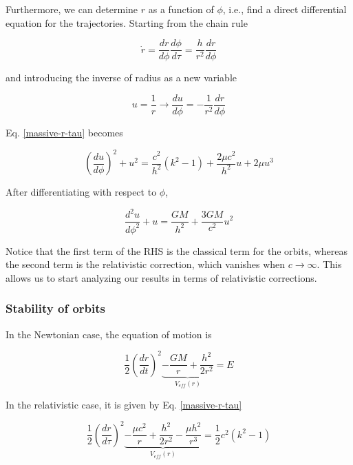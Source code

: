 \documentclass[letterpaper,11pt,onecolumn]{article}
\begin{document}
Furthermore, we can determine $r$ as a function of $\phi$, i.e., find a direct differential equation for the trajectories. Starting from the chain rule 

\begin{equation*}
    \dot{r} = \frac{dr}{d\phi} \frac{d\phi}{d\tau} = \frac{h}{r^2} \frac{dr}{d\phi} 
\end{equation*}

and introducing the inverse of radius as a new variable 

\begin{equation*}
    u = \frac{1}{r} \longrightarrow \frac{du}{d\phi} = - \frac{1}{r^2} \frac{dr}{d\phi}
\end{equation*}

Eq. \ref{massive-r-tau} becomes

\begin{equation}
    \left( \frac{du}{d\phi} \right)^2 + u^2 = \frac{c^2}{h^2} (k^2 - 1) + \frac{2\mu c^2}{h^2} u + 2 \mu u^3
\end{equation}

After differentiating with respect to $\phi$, 

\begin{equation} \label{massive-u-eq}
    \frac{d^2u}{d \phi^2} + u = \frac{GM}{h^2} + \frac{3GM}{c^2} u^2
\end{equation}

Notice that the first term of the RHS is the classical term for the orbits, whereas the second term is the relativistic correction, which vanishes when $c\to\infty$. This allows us to start analyzing our results in terms of relativistic corrections. 

\subsubsection{Stability of orbits}

In the Newtonian case, the equation of motion is 

\begin{equation} \label{massive-traj-newton}
    \frac12 \left( \frac{dr}{dt} \right)^2  \underbrace{-\frac{GM}{r} + \frac{h^2}{2r^2}}_{V_{eff}(r)} = E
\end{equation}

In the relativistic case, it is given by Eq. \ref{massive-r-tau}

\begin{equation} \label{massive-traj-rela}
    \frac12 \left( \frac{dr}{d\tau} \right)^2  \underbrace{-\frac{\mu c^2}{r} + \frac{h^2}{2r^2} - \frac{\mu h^2}{r^3}}_{V_{eff}(r)} = \frac12 c^2 (k^2-1)
\end{equation}
\end{document}
